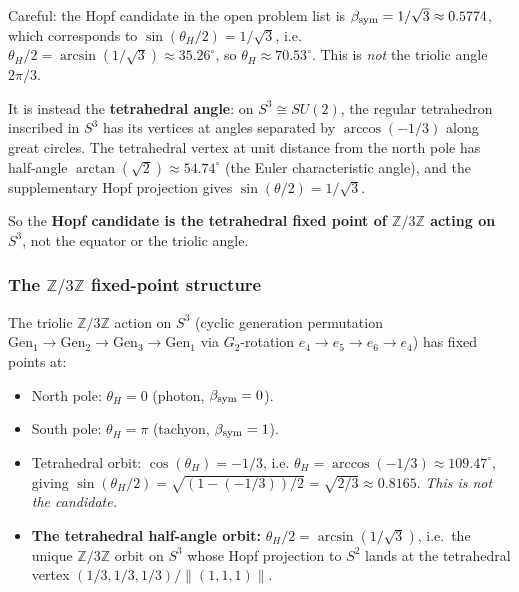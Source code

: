 \begin{remark}
\label{rem:hopf-candidate-fix}
Careful: the Hopf candidate in the open problem list is
$\beta_{\mathrm{sym}} = 1/\sqrt{3} \approx 0.5774$, which corresponds to
$\sin(\theta_H/2) = 1/\sqrt{3}$, i.e. $\theta_H/2 = \arcsin(1/\sqrt{3}) \approx 35.26^\circ$,
so $\theta_H \approx 70.53^\circ$.
This is \emph{not} the triolic angle $2\pi/3$.

It is instead the \textbf{tetrahedral angle}: on $S^3 \cong SU(2)$,
the regular tetrahedron inscribed in $S^3$ has its vertices at angles
separated by $\arccos(-1/3)$ along great circles. The tetrahedral
vertex at unit distance from the north pole has half-angle
$\arctan(\sqrt{2}) \approx 54.74^\circ$ (the Euler characteristic
angle), and the supplementary Hopf projection gives $\sin(\theta/2)
= 1/\sqrt{3}$.

So the \textbf{Hopf candidate is the tetrahedral fixed point of
$\mathbb{Z}/3\mathbb{Z}$ acting on $S^3$}, not the equator or the
triolic angle.
\end{remark}

\subsubsection{The $\mathbb{Z}/3\mathbb{Z}$ fixed-point structure}

\begin{proposition}
\label{prop:z3z-orbits}
The triolic $\mathbb{Z}/3\mathbb{Z}$ action on $S^3$ (cyclic
generation permutation $\mathrm{Gen}_1 \to \mathrm{Gen}_2 \to
\mathrm{Gen}_3 \to \mathrm{Gen}_1$ via $G_2$-rotation
$e_4 \to e_5 \to e_6 \to e_4$) has fixed points at:
\begin{itemize}
\item North pole: $\theta_H = 0$ (photon, $\beta_{\mathrm{sym}} = 0$).
\item South pole: $\theta_H = \pi$ (tachyon, $\beta_{\mathrm{sym}} = 1$).
\item Tetrahedral orbit: $\cos(\theta_H) = -1/3$, i.e. $\theta_H = \arccos(-1/3) \approx 109.47^\circ$, giving $\sin(\theta_H/2) = \sqrt{(1 - (-1/3))/2} = \sqrt{2/3} \approx 0.8165$. \emph{This is not the candidate.}
\item \textbf{The tetrahedral half-angle orbit:} $\theta_H/2 =
  \arcsin(1/\sqrt{3})$, i.e.\ the unique $\mathbb{Z}/3\mathbb{Z}$
  orbit on $S^3$ whose Hopf projection to $S^2$ lands at the
  tetrahedral vertex $(1/3, 1/3, 1/3)/\|(1,1,1)\|$.
\end{itemize}
\end{proposition}

